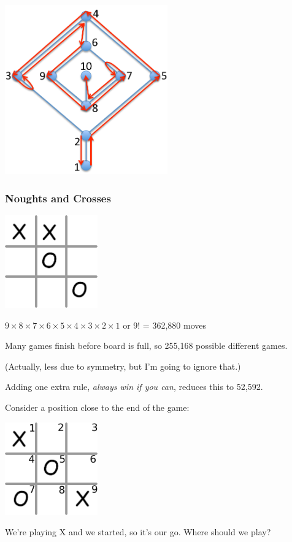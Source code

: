 \documentclass{beamer} %
\begin{document}
\begin{frame}
  \centering
  \includegraphics[width=70mm]{assets/maze-b5-crop.pdf}
\end{frame}

\begin{frame}
  \frametitle{Noughts and Crosses}
  \begin{center}
    \includegraphics[width=0.3\textwidth]{assets/oxo-board1.pdf}
    \end{center}

  $9\times8\times7\times6\times5\times4\times3\times2\times1$ or 9! = 362,880 moves

  Many games finish before board is full, so 255,168 possible different games.

  (Actually, less due to symmetry, but I'm going to ignore that.)

  Adding one extra rule, \textit{always win if you can}, reduces this to 52,592.
\end{frame}
\begin{frame}
  Consider a position close to the end of the game:

  \begin{center}
  \includegraphics[width=0.3\textwidth]{assets/oxo-board3.pdf}
      \end{center}

  We're playing {\sf X} and we started, so it's our go.  Where should we play?
\end{frame}
\end{document}
